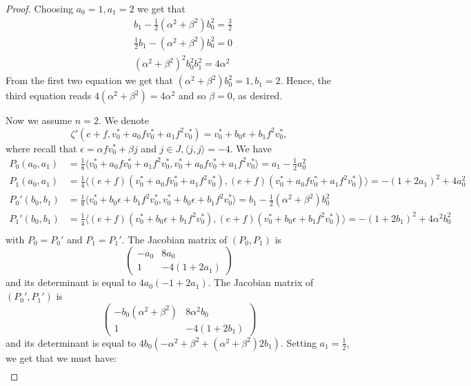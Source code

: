\documentclass[10pt,a4paper]{amsart}
\begin{document}
\begin{proof}
    Choosing $a_0=1, a_1 = 2$ we get that
    \[
    \begin{aligned}
        &b_1-\frac{1}{2}(\alpha^2+\beta^2)b_0^2 = \frac{3}{2}\\
        &\frac{1}{2}b_1 - (\alpha^2+\beta^2)b_0^2 = 0\\
        &(\alpha^2+\beta^2)^2b_0^2b_1^2 = 4\alpha^2
    \end{aligned}
    \]
    From the first two equation we get that $(\alpha^2+\beta^2)b_0^2=1, b_1=2$.
    Hence, the third equation reads $4(\alpha^2+\beta^2)=4\alpha^2$ and so $\beta=0$, as desired.

    Now we assume $n=2$.
    We denote $$\zeta'(e+f, v_0^* + a_0fv_0^* + a_1f^2v_0^*)= v_0^*+b_0\epsilon+b_1f^2v_0^*,$$
    where recall that $\epsilon = \alpha fv_0^* + \beta j$ and $j\in J, \langle j, j\rangle = -4$.
    We have
    \[\begin{aligned}
        P_0(a_0, a_1) &= \frac{1}{8}\langle v_0^* + a_0fv_0^* + a_1f^2v_0^*, v_0^* + a_0fv_0^* + a_1f^2v_0^*\rangle = a_1-\frac{1}{2}a_0^2\\
        P_1(a_0, a_1) &= \frac{1}{4}\langle (e+f)(v_0^* + a_0fv_0^* + a_1f^2v_0^*), (e+f) (v_0^* + a_0fv_0^* + a_1f^2v_0^*)\rangle = -(1+2a_1)^2 + 4a_0^2\\
        P_0'(b_0, b_1) &= \frac{1}{8}\langle v_0^*+b_0\epsilon+b_1f^2v_0^*, v_0^*+b_0\epsilon+b_1f^2v_0^*\rangle = b_1-\frac{1}{2}(\alpha^2+\beta^2)b_0^2\\
        P_1'(b_0, b_1) &= \frac{1}{4}\langle (e+f)(v_0^* + b_0\epsilon + b_1f^2v_0^*), (e+f) (v_0^* + b_0\epsilon + b_1f^2v_0^*)\rangle = -(1+2b_1)^2 + 4\alpha^2b_0^2\\
    \end{aligned}\]
    with $P_0 = P_0'$ and $P_1 = P_1'$.
    The Jacobian matrix of $(P_0, P_1)$ is $$\begin{pmatrix}
        -a_0 & 8a_0\\
        1 & -4(1+2a_1)
    \end{pmatrix}$$
    and its determinant is equal to $4a_0(-1+2a_1)$.
    The Jacobian matrix of $(P_0', P_1')$ is $$\begin{pmatrix}
        -b_0(\alpha^2+\beta^2)&8\alpha^2b_0\\
        1& -4(1+2b_1)
    \end{pmatrix}$$
    and its determinant is equal to $4b_0(-\alpha^2+\beta^2+(\alpha^2+\beta^2)2b_1)$.
    Setting $a_1 = \frac{1}{2}$, we get that we must have:
    \[
    \begin{aligned}

\end{aligned}\]
\end{proof}
\end{document}
